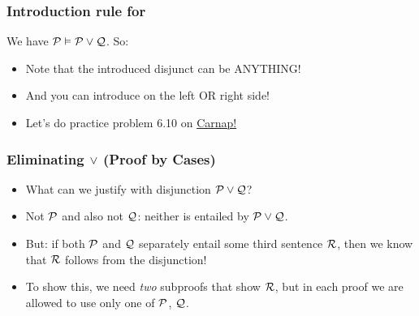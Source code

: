 \begin{frame}
  \frametitle{Introduction rule for \eor}
  We have $\mathcal{P} \vDash \mathcal{P} \vee \mathcal{Q}$. So:

\begin{multicols}{2}

  \begin{fitchproof}
     
  \end{fitchproof}
\columnbreak

  \begin{fitchproof}
     
  \end{fitchproof}

\end{multicols}

\begin{itemize}[<+->]

\item Note that the introduced disjunct can be ANYTHING!

\item And you can introduce on the left OR right side!

\item Let's do practice problem 6.10 on \href{https://tinyurl.com/2p82rpv5}{Carnap!}

\end{itemize}

\end{frame}

\begin{frame}
  \begin{fitchproof}
    \open
     
    \close
  \end{fitchproof}
\end{frame}

\begin{frame}
  \frametitle{Eliminating $\vee$ (Proof by Cases)}

  \begin{itemize}[<+->]
  \item What can we justify with disjunction $\mathcal{P} \vee \mathcal{Q}$?

  \item Not $\mathcal{P}$ and also not $\mathcal{Q}$: neither is entailed by
  $\mathcal{P} \vee \mathcal{Q}$.

  \item But: if both $\mathcal{P}$ and $\mathcal{Q}$ separately entail some
  third sentence $\mathcal{R}$, then we know that $\mathcal{R}$ follows from the disjunction!

  \item To show this, we need \emph{two} subproofs that show $\mathcal{R}$, but
  in each proof we are allowed to use only one of $\mathcal{P}$, $\mathcal{Q}$.
  \end{itemize}
\end{frame}

